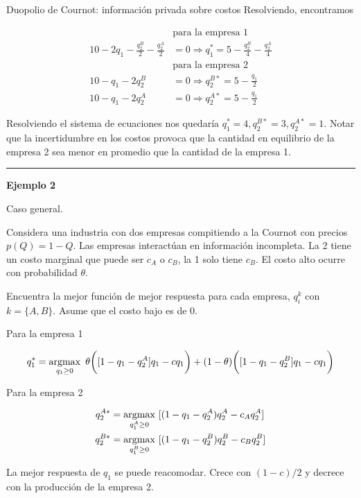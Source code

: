 \documentclass[12pt]{article}
\begin{document}
\begin{exbox}{Duopolio de Cournot: información privada sobre costos}
	Resolviendo, encontramos

	\begin{align*}
		                                             & \text{para la empresa 1}                                         \\
		10 - 2q_1 -\frac{q_2^B}{2} - \frac{q_2^A}{2} & = 0 \Longrightarrow q_1^* = 5 -\frac{q_2^B}{4} - \frac{q_2^A}{4} \\
		                                             & \text{para la empresa 2}                                         \\
		10 - q_1 - 2q_2^B                            & = 0 \Longrightarrow q_2^{B*} = 5 - \frac{q_1}{2}                 \\
		10 - q_1 - 2q_2^A                            & = 0 \Longrightarrow q_2^{A*} = 5 - \frac{q_1}{2}
	\end{align*}

	Resolviendo el sistema de ecuaciones nos quedaría $ q_1^* = 4, q_2^{B*} = 3, q_2^{A*} = 1 $. Notar que la incertidumbre en los costos provoca que la cantidad en equilibrio de la empresa 2 sea menor en promedio que la cantidad de la empresa 1.

	\rule{2cm}{1pt}

	\textbf{Ejemplo 2}

Caso general.

Considera una industria con dos empresas compitiendo a la Cournot con precios $ p(Q) = 1 - Q $. Las empresas interactúan en información incompleta. La 2 tiene un costo marginal que puede ser $ c_A $ o $ c_B $, la 1 solo tiene $ c_B$. El costo alto ocurre con probabilidad $ \theta $.

Encuentra la mejor función de mejor respuesta para cada empresa, $ q_i^k $ con $ k = \{A, B\} $. Asume que el costo bajo es de 0.

Para la empresa 1

\[ q_1^* = \operatorname*{argmax}_{q_1 \geq 0}~\theta\biggl([1 - q_1 - q_2^A]q_1 -cq_1\biggr) + (1 - \theta)\biggl([1 - q_1 - q_2^B]q_1 -cq_1\biggr) \]

Para la empresa 2

\begin{align*}
q_2^{A*} & = \operatorname*{argmax}_{ q_1^A\geq 0}~[(1-q_1 - q_2^A)q_2^A - c_Aq_2^A]      \\
q_2^{B*} & = \operatorname*{argmax}_{q_1^B\geq 0 }~[(1-q_1 - q_2^B)q_2^B - c_Bq_2^B]  
\end{align*}

La mejor respuesta de $ q_1 $ se puede reacomodar. Crece con $(1-c)/2 $ y decrece con la producción de la empresa 2.


\end{exbox}
\end{document}
